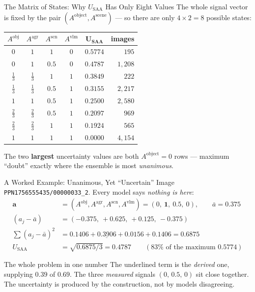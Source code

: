 \documentclass[aspectratio=169,11pt]{beamer}
\begin{document}
\begin{frame}{The Matrix of States: Why $U_{\text{SAA}}$ Has Only Eight Values}
\small
The whole signal vector is fixed by the pair $(A^{\text{object}}, A^{\text{scene}})$ --- so there are only $4 \times 2 = 8$ possible states:
\vspace{1mm}
\begin{center}
\footnotesize
\begin{tabular}{@{}cccc c r@{}}
\toprule
$A^{\text{obj}}$ & $A^{\text{agr}}$ & $A^{\text{scn}}$ & $A^{\text{vlm}}$ & $\bm{U_{\text{SAA}}}$ & \textbf{images} \\
\midrule
$0$ & $1$ & $1$ & $0$ & $\mathbf{0.5774}$ & $195$ \\
$0$ & $1$ & $0.5$ & $0$ & $\mathbf{0.4787}$ & $1{,}208$ \\
$\tfrac13$ & $\tfrac13$ & $1$ & $1$ & $0.3849$ & $222$ \\
$\tfrac13$ & $\tfrac13$ & $0.5$ & $1$ & $0.3155$ & $2{,}217$ \\
$1$ & $1$ & $0.5$ & $1$ & $0.2500$ & $2{,}580$ \\
$\tfrac23$ & $\tfrac23$ & $0.5$ & $1$ & $0.2097$ & $969$ \\
$\tfrac23$ & $\tfrac23$ & $1$ & $1$ & $0.1924$ & $565$ \\
$1$ & $1$ & $1$ & $1$ & $0.0000$ & $4{,}154$ \\
\bottomrule
\end{tabular}
\end{center}
\vspace{1mm}
\footnotesize The two \textbf{largest} uncertainty values are both $A^{\text{object}}=0$ rows --- maximum ``doubt'' exactly where the ensemble is most \emph{unanimous}.
\end{frame}

\begin{frame}{A Worked Example: Unanimous, Yet ``Uncertain''}
\small
Image \texttt{PPN1756555435/00000033\_2}. Every model says \emph{nothing is here}:
\vspace{1mm}
\begin{align*}
\mathbf{a} &= (A^{\text{obj}}, A^{\text{agr}}, A^{\text{scn}}, A^{\text{vlm}}) = (0,\ \mathbf{1},\ 0.5,\ 0), \qquad \bar a = 0.375\\[1mm]
(a_j - \bar a) &= (-0.375,\ +0.625,\ +0.125,\ -0.375)\\[1mm]
\textstyle\sum (a_j - \bar a)^2 &= 0.1406 + \underline{\mathbf{0.3906}} + 0.0156 + 0.1406 = 0.6875\\[1mm]
U_{\text{SAA}} &= \sqrt{0.6875/3} = \mathbf{0.4787} \qquad (83\% \text{ of the maximum } 0.5774)
\end{align*}
\vspace{1mm}
\begin{alertblock}{\small The whole problem in one number}
\footnotesize The underlined term is the \emph{derived} one, supplying $0.39$ of $0.69$. The three \emph{measured} signals $(0,\,0.5,\,0)$ sit close together. The uncertainty is produced by the construction, not by models disagreeing.
\end{alertblock}
\end{frame}
\end{document}
